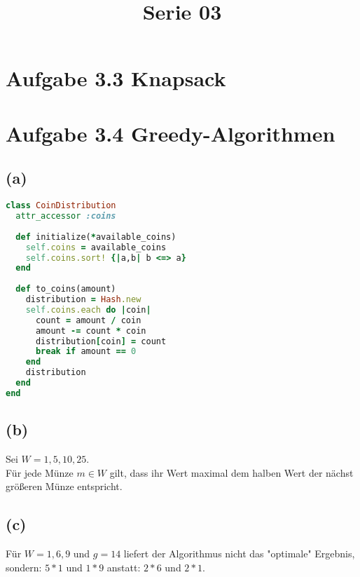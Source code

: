  
\title{Serie 03}

 
\section*{Aufgabe 3.3 Knapsack}

\section*{Aufgabe 3.4 Greedy-Algorithmen}

\subsection*{(a)}

\begin{lstlisting}[language=Ruby,numbers=right]
class CoinDistribution
  attr_accessor :coins
  
  def initialize(*available_coins)
    self.coins = available_coins
    self.coins.sort! {|a,b| b <=> a}
  end
  
  def to_coins(amount)
    distribution = Hash.new
    self.coins.each do |coin|
      count = amount / coin
      amount -= count * coin
      distribution[coin] = count
      break if amount == 0
    end
    distribution
  end
end  
\end{lstlisting}

\subsection*{(b)}

Sei $W = {1,5,10,25}$.\\
Für jede Münze $m \in W$ gilt, dass ihr Wert maximal dem halben Wert der nächst größeren Münze entspricht.\\ 


\subsection*{(c)}

Für $W = {1,6,9}$ und $g = 14$ liefert der Algorithmus nicht das "optimale" Ergebnis, sondern: $5 * 1$ und $1 * 9$ anstatt: $2 * 6$ und $2 * 1$.


